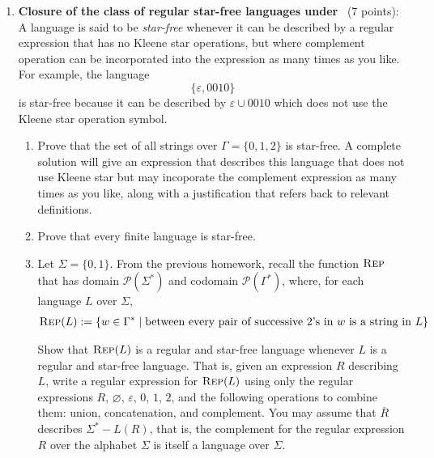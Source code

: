 \begin{enumerate}
\item {\bf Closure of the class of regular star-free languages under} \REP~(7 points):\\
A language is said to be \emph{star-free} whenever it can be described by a regular expression that 
has no Kleene star operations, but where complement operation can be 
incorporated into the expression as many times as you like. 
For example, the language $$\{\varepsilon, 0010\}$$ is star-free because it can be described
by $\varepsilon \cup 0010$ which does not use the Kleene star operation symbol.
\begin{enumerate}
    \item\gradeCorrect Prove that the set of all strings 
    over $\Gamma = \{0,1,2\}$ is star-free. A complete solution
    will give an expression that describes this language 
    that does not use Kleene star but may incoporate the complement
    expression as many times as you like, along 
    with a justification that refers back to relevant definitions.
    \item\gradeComplete Prove that every finite language is star-free.
    \item\gradeComplete Let $\Sigma = \{0,1\}$. From the previous
    homework, recall the function $\textsc{Rep}$ that has domain 
    $\mathcal{P}(\Sigma^*)$ and codomain $\mathcal{P}(\Gamma^*)$, 
    where, for each language $L$ over $\Sigma$,
    \begin{align*}
        \textsc{Rep}(L) &:= \{ w \in \Gamma^* \mid \text{between every 
    pair of successive $2$'s in $w$ is a string in $L$}\}
    \end{align*}
    
    Show that $\textsc{Rep}(L)$ is a regular and star-free language 
    whenever $L$ is a regular and star-free language. That is, 
    given an expression $R$ describing $L$, write a regular 
    expression for $\textsc{Rep}(L)$ using only the regular expressions 
    $R$, $\varnothing$, $\varepsilon$, $0$, $1$, $2$, and the 
    following operations to combine them: union, concatenation, 
    and complement. You may assume that $\overline{R}$
    describes $\Sigma^* -L(R)$, that is, the complement for the regular expression $R$ over the alphabet $\Sigma$ is itself 
    a language over $\Sigma$. 
\end{enumerate}

\end{enumerate}

\newpage

